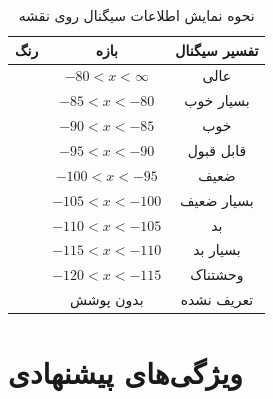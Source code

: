 \documentclass[oneside]{report}
\begin{document}
\begin{table}[h!]
      \centering
      \begin{tabular}{|c|c|c|}
            \hline
            رنگ                           & بازه               & تفسیر سیگنال \\
            \hline
            \cellcolor{excellent_color}   & $-80 < x < \infty$ & عالی         \\
            \hline
            \cellcolor{very_good_color}   & $-85 < x < -80$    & بسیار خوب    \\
            \hline
            \cellcolor{good_color}        & $-90 < x < -85$    & خوب          \\
            \hline
            \cellcolor{fair_color}        & $-95 < x < -90$    & قابل قبول    \\
            \hline
            \cellcolor{poor_color}        & $-100 < x < -95$   & ضعیف         \\
            \hline
            \cellcolor{very_poor_color}   & $-105 < x < -100$  & بسیار ضعیف   \\
            \hline
            \cellcolor{bad_color}         & $-110 < x < -105$  & بد           \\
            \hline
            \cellcolor{very_bad_color}    & $-115 < x < -110$  & بسیار بد     \\
            \hline
            \cellcolor{awful_color}       & $-120 < x < -115$  & وحشتناک      \\
            \hline
            \cellcolor{no_coverage_color} & بدون پوشش          & تعریف نشده   \\
            \hline
      \end{tabular}
      \caption{نحوه نمایش اطلاعات سیگنال روی نقشه}
      \label{table:signal}
\end{table}

\section{ویژگی‌های پیشنهادی}
\end{document}
